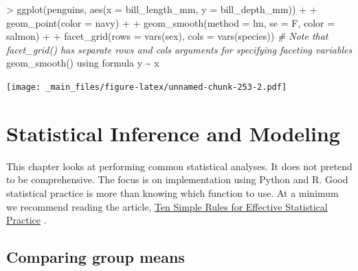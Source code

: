 \documentclass[
]{book}
\newenvironment{Shaded}{\begin{snugshade}}{\end{snugshade}}
\newcommand{\AttributeTok}[1]{\textcolor[rgb]{0.77,0.63,0.00}{#1}}
\newcommand{\CommentTok}[1]{\textcolor[rgb]{0.56,0.35,0.01}{\textit{#1}}}
\newcommand{\FunctionTok}[1]{\textcolor[rgb]{0.00,0.00,0.00}{#1}}
\newcommand{\NormalTok}[1]{#1}
\newcommand{\SpecialCharTok}[1]{\textcolor[rgb]{0.00,0.00,0.00}{#1}}
\newcommand{\StringTok}[1]{\textcolor[rgb]{0.31,0.60,0.02}{#1}}
\begin{document}
\begin{Shaded}
\begin{Highlighting}[]
\SpecialCharTok{\textgreater{}} \FunctionTok{ggplot}\NormalTok{(penguins, }\FunctionTok{aes}\NormalTok{(}\AttributeTok{x =}\NormalTok{ bill\_length\_mm, }\AttributeTok{y =}\NormalTok{ bill\_depth\_mm)) }\SpecialCharTok{+}
\SpecialCharTok{+}   \FunctionTok{geom\_point}\NormalTok{(}\AttributeTok{color =} \StringTok{\textquotesingle{}navy\textquotesingle{}}\NormalTok{) }\SpecialCharTok{+}
\SpecialCharTok{+}   \FunctionTok{geom\_smooth}\NormalTok{(}\AttributeTok{method =} \StringTok{\textquotesingle{}lm\textquotesingle{}}\NormalTok{, }\AttributeTok{se =}\NormalTok{ F, }\AttributeTok{color =} \StringTok{\textquotesingle{}salmon\textquotesingle{}}\NormalTok{) }\SpecialCharTok{+}
\SpecialCharTok{+}   \FunctionTok{facet\_grid}\NormalTok{(}\AttributeTok{rows =} \FunctionTok{vars}\NormalTok{(sex), }\AttributeTok{cols =} \FunctionTok{vars}\NormalTok{(species)) }\CommentTok{\# Note that facet\_grid() has separate \textasciigrave{}rows\textasciigrave{} and \textasciigrave{}cols\textasciigrave{} arguments for specifying faceting variables}
\StringTok{\textasciigrave{}}\AttributeTok{geom\_smooth()}\StringTok{\textasciigrave{}}\NormalTok{ using formula }\StringTok{\textquotesingle{}y \textasciitilde{} x\textquotesingle{}}
\end{Highlighting}
\end{Shaded}

\texttt{[image: \_main\_files/figure-latex/unnamed-chunk-253-2.pdf]}

\hypertarget{statistical-inference-and-modeling}{%
\chapter{Statistical Inference and Modeling}\label{statistical-inference-and-modeling}}

This chapter looks at performing common statistical analyses. It does not pretend to be comprehensive. The focus is on implementation using Python and R. Good statistical practice is more than knowing which function to use. At a minimum we recommend reading the article, \href{https://journals.plos.org/ploscompbiol/article?id=10.1371/journal.pcbi.1004961}{Ten Simple Rules for Effective Statistical Practice} \citep{kass_caffo_davidian_meng_yu_reid_2016}.

\hypertarget{comparing-group-means}{%
\section{Comparing group means}\label{comparing-group-means}}
\end{document}

